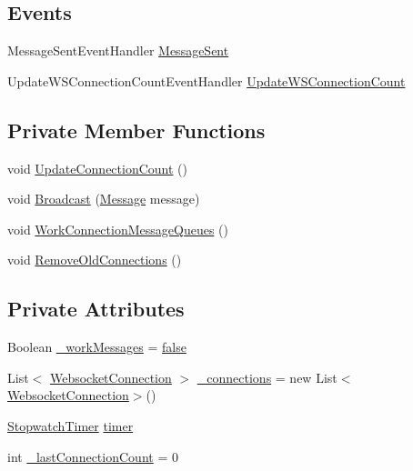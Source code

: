 \subsection*{Events}
\begin{DoxyCompactItemize}
\item 
Message\+Sent\+Event\+Handler \hyperlink{class_web_analyzer_1_1_server_1_1_connection_manager_a2eb5de18882e69a65b4b7ce3ee458af1}{Message\+Sent}
\item 
Update\+W\+S\+Connection\+Count\+Event\+Handler \hyperlink{class_web_analyzer_1_1_server_1_1_connection_manager_ab583440105517709081698d731b2bdcd}{Update\+W\+S\+Connection\+Count}
\end{DoxyCompactItemize}
\subsection*{Private Member Functions}
\begin{DoxyCompactItemize}
\item 
void \hyperlink{class_web_analyzer_1_1_server_1_1_connection_manager_a68db2e8493dd838aec226f40db1d5a6e}{Update\+Connection\+Count} ()
\item 
void \hyperlink{class_web_analyzer_1_1_server_1_1_connection_manager_a802503ffd29cf9a18a2bfae95adc4b4e}{Broadcast} (\hyperlink{class_web_analyzer_1_1_models_1_1_message_model_1_1_message}{Message} message)
\item 
void \hyperlink{class_web_analyzer_1_1_server_1_1_connection_manager_a773422b69490cf64139d8237a9122eaa}{Work\+Connection\+Message\+Queues} ()
\item 
void \hyperlink{class_web_analyzer_1_1_server_1_1_connection_manager_a2c3ef15396b89a8ec145e62158348faf}{Remove\+Old\+Connections} ()
\end{DoxyCompactItemize}
\subsection*{Private Attributes}
\begin{DoxyCompactItemize}
\item 
Boolean \hyperlink{class_web_analyzer_1_1_server_1_1_connection_manager_a23a1f3a046b14bcb1333c3ef846015d6}{\+\_\+work\+Messages} = \hyperlink{_u_i_2_h_t_m_l_resources_2js_2src_2export_8js_ae6c865df784842196d411c1466b01686}{false}
\item 
List$<$ \hyperlink{class_web_analyzer_1_1_server_1_1_websocket_connection}{Websocket\+Connection} $>$ \hyperlink{class_web_analyzer_1_1_server_1_1_connection_manager_a4d1d80f0e1bca824c36908efcc4f9dc0}{\+\_\+connections} = new List$<$\hyperlink{class_web_analyzer_1_1_server_1_1_websocket_connection}{Websocket\+Connection}$>$()
\item 
\hyperlink{class_web_analyzer_1_1_util_1_1_stopwatch_timer}{Stopwatch\+Timer} \hyperlink{class_web_analyzer_1_1_server_1_1_connection_manager_aa639f32d7193a808bd9680359b325887}{timer}
\item 
int \hyperlink{class_web_analyzer_1_1_server_1_1_connection_manager_a26374e3936745ea45ecf5f77e4d8884f}{\+\_\+last\+Connection\+Count} = 0
\end{DoxyCompactItemize}


